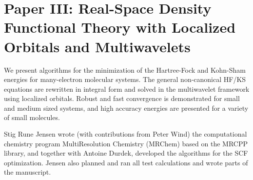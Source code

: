 \pagebreak

\section{Paper III: Real-Space Density Functional Theory with Localized Orbitals and Multiwavelets}
We present algorithms for the minimization of the Hartree-Fock and Kohn-Sham energies for many-electron 
molecular systems. The general non-canonical HF/KS equations are rewritten in integral form and solved 
in the multiwavelet framework using localized orbitals. Robust and fast convergence is demonstrated for 
small and medium sized systems, and high accuracy energies are presented for a variety of small molecules.

Stig Rune Jensen wrote (with contributions from Peter Wind) the computational chemistry program
MultiResolution Chemistry (MRChem) based on the MRCPP library, and together with Antoine Durdek,
developed the algorithms for the SCF optimization. Jensen also planned and ran all test calculations 
and wrote parts of the manuscript.


